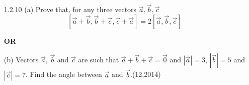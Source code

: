 \begin{enumerate}[label={},font=\normalfont,leftmargin=1.15cm,labelwidth=1.0cm,labelsep=0.15cm,itemindent=0pt,listparindent=0pt,itemsep=\baselineskip,parsep=0pt,topsep=0pt]
The left hand side is $\frac{d}{dx}\left[(x^2-1)y\right]$. Let $w=(x^2-1)y$, so that $\frac{dw}{dx}=\frac{2}{x^2-1}$. For $0\le x<1$, let $x=\tanh t$, $t\ge0$. Using (\ref{formula-1-1-9}), $\frac{dx}{dt}=1-x^2$, so
\[
\frac{dw}{dt}=\frac{dw}{dx}\cdot\frac{dx}{dt}=\frac{2}{x^2-1}(1-x^2)=-2,\qquad w(0)=w_0.
\]
Multiplying by the unit step $u(t)$, $w^{\prime}(t)u(t)=-2u(t)$. Using (\ref{formula-1-1-8}) with $W(s)=\mathcal{L}\{w(t)u(t)\}$,
\[
sW(s)-w_0=-\frac{2}{s}\implies W(s)=\frac{w_0}{s}-\frac{2}{s^2}.
\]
Taking the inverse transform term by term,
\[
w(t)u(t)=w_0u(t)-2tu(t)=(w_0-2t)u(t).
\]
Substituting $t=\frac{1}{2}\ln\frac{1+x}{1-x}$ from (\ref{formula-1-1-9}), with $C=w_0$,
\[
\boxed{y=\frac{1}{x^2-1}\left[\ln\left|\frac{x-1}{x+1}\right|+C\right]}.
\]
Since $\frac{d}{dx}\ln\left|\frac{x-1}{x+1}\right|=\frac{2}{x^2-1}$ for all $x\ne\pm1$, this solves the equation on every interval. The Python program checks the differential equation for $C=-1,0,2$:
\par\noindent\begin{minipage}{\linewidth}
\begin{lstlisting}[frame=single, basicstyle=\rmfamily, escapeinside={(*@}{@*)}]
(*@\makebox[\dimexpr\linewidth-2\fboxsep-2\fboxrule\relax][c]{codes/1.2.9.py}@*)
\end{lstlisting}
\end{minipage}\par

\item[1.2.10]
\noindent(a) Prove that, for any three vectors $\vec{a},\vec{b},\vec{c}$
\[
\left[\vec{a}+\vec{b},\vec{b}+\vec{c},\vec{c}+\vec{a}\right]=2\left[\vec{a},\vec{b},\vec{c}\right]
\]\par
\noindent\textbf{OR}\par
\noindent(b) Vectors $\vec{a}$, $\vec{b}$ and $\vec{c}$ are such that $\vec{a}+\vec{b}+\vec{c}=\vec{0}$ and $|\vec{a}|=3$, $|\vec{b}|=5$ and $|\vec{c}|=7$. Find the angle between $\vec{a}$ and $\vec{b}$.\nobreak\hfill\mbox{(12,2014)}



\vspace{0.6em}\par\solution


\end{enumerate}
